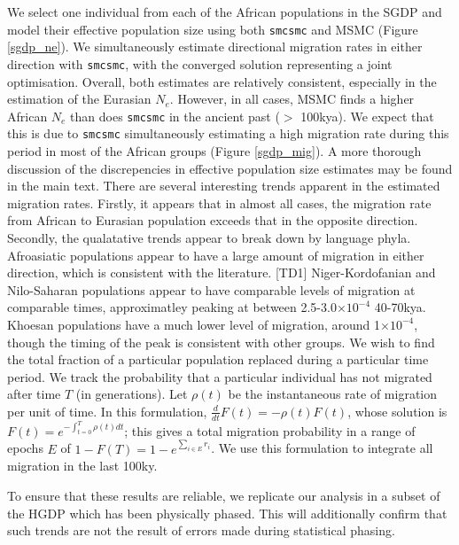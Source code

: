 \documentclass{article}
\begin{document}
We select one individual from each of the African populations in the SGDP and model their effective population size using both {\tt smcsmc} and MSMC (Figure \ref{sgdp_ne}). We simultaneously estimate directional migration rates in either direction with {\tt smcsmc}, with the converged solution representing a joint optimisation. Overall, both estimates are relatively consistent, especially in the estimation of the Eurasian $N_e$. However, in all cases, MSMC finds a higher African $N_e$ than does {\tt smcsmc} in the ancient past ($>$ 100kya). We expect that this is due to {\tt smcsmc} simultaneously estimating a high migration rate during this period in most of the African groups (Figure \ref{sgdp_mig}). A more thorough discussion of the discrepencies in effective population size estimates may be found in the main text. There are several interesting trends apparent in the estimated migration rates. Firstly, it appears that in almost all cases, the migration rate from African to Eurasian population exceeds that in the opposite direction. Secondly, the qualatative trends appear to break down by language phyla. Afroasiatic populations appear to have a large amount of migration in either direction, which is consistent with the literature. [TD1] Niger-Kordofanian and Nilo-Saharan populations appear to have comparable levels of migration at comparable times, approximatley peaking at between 2.5-3.0$\times 10^{-4}$ 40-70kya. Khoesan populations have a much lower level of migration, around 1$\times 10^{-4}$, though the timing of the peak is consistent with other groups. We wish to find the total fraction of a particular population replaced during a particular time period. We track the probability that a particular individual has not migrated after time $T$ (in generations). Let $\rho(t)$ be the instantaneous rate of migration per unit of time. In this formulation, $\frac{d}{dt} F(t) = - \rho(t) F(t)$, whose solution is $F(t) = e^{- \int_{t=0}^T \rho(t) dt}$; this gives a total migration probability in a range of epochs $E$ of  $1-F(T) = 1 - e^{\sum_{i \in E} r_i}$. We use this formulation to integrate all migration in the last 100ky. 

To ensure that these results are reliable, we replicate our analysis in a subset of the HGDP which has been physically phased. This will additionally confirm that such trends are not the result of errors made during statistical phasing.
\end{document}
